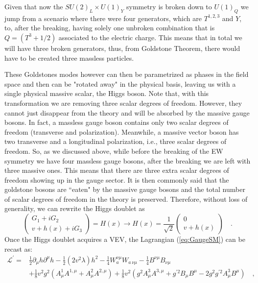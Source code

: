 Given that now the $SU(2)_L \times U(1)_Y$ symmetry is broken down to $U(1)_Q$ we jump from a scenario where there were four generators, which are $T^{1,2,3}$ and $Y$, to, after the breaking, having solely one unbroken combination that is $Q =  (T^3 + 1/2)$ associated to the electric charge. This means that in total we will have three broken generators, thus, from Goldstone Theorem, there would have to be created three massless particles. 

These Goldstones modes however can then be parametrized as phases in the field space and then can be "rotated away" in the physical basis, leaving us with a single physical massive scalar, the Higgs boson. Note that, with this transformation we are removing three scalar degrees of freedom.  However, they cannot just disappear from the theory and will be absorbed by the massive gauge bosons.
%
In fact, a massless gauge boson contains only two scalar degrees of freedom (transverse and polarization). Meanwhile, a massive vector boson has two transverse and a longitudinal polarization, i.e., three scalar degrees of freedom. So, as we discussed above, while before the breaking of the EW symmetry we have four massless gauge bosons, after the breaking we are left with three massive ones. This means that there are three extra scalar degrees of freedom showing up in the gauge sector. It is then commonly said that the goldstone bosons are ``eaten" by the massive gauge bosons and the total number of scalar degrees of freedom in the theory is preserved. Therefore, without loss of generality, we can rewrite the Higgs doublet as
%
\begin{equation}
 \begin{pmatrix}
G_1 + i G_2 \\ 
v + h(x) + i G_3 
\end{pmatrix} = H (x) \rightarrow H (x) =  \frac{1}{\sqrt{2}} \begin{pmatrix}
0 \\ 
v + h(x) 
\end{pmatrix} \quad .
\label{shame}
\end{equation}
Once the Higgs doublet acquires a VEV, the Lagrangian (\ref{eq:GaugeSM}) can be recast as:
%
\begin{align}
\mathcal{L}^\prime = & \frac{1}{2} \partial_\mu h \partial^\mu h - \frac{1}{2} (2v^2 \lambda) h^2
 - \frac{1}{4}  W^{\nu \mu}_a W_{a \,\nu \mu}  
- \frac{1}{4}  B^{\nu \mu} B_{\nu \mu}  \nonumber \\
& + \frac{1}{8} v^2 g^2 (A^1_\mu A^{1,\mu}+ A^2_\mu A^{2,\mu}) +  \frac{1}{8} v^2  (g^2  A^3_\mu A^{3,\mu} + g^{\prime 2} B_\mu B^\mu - 2 g^2 g^{\prime 2} A^3_\mu B^\mu ) \quad , 
\label{complicatedpart}
\end{align}
